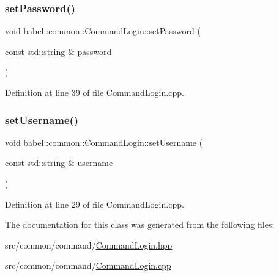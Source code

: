 \subsubsection{\texorpdfstring{set\+Password()}{setPassword()}}
{\footnotesize\ttfamily void babel\+::common\+::\+Command\+Login\+::set\+Password (\begin{DoxyParamCaption}\item[{const std\+::string \&}]{password }\end{DoxyParamCaption})}



Definition at line 39 of file Command\+Login.\+cpp.

\mbox{\label{classbabel_1_1common_1_1_command_login_a88f5f41f0152259bd1351f5c1121b853}} 
\subsubsection{\texorpdfstring{set\+Username()}{setUsername()}}
{\footnotesize\ttfamily void babel\+::common\+::\+Command\+Login\+::set\+Username (\begin{DoxyParamCaption}\item[{const std\+::string \&}]{username }\end{DoxyParamCaption})}



Definition at line 29 of file Command\+Login.\+cpp.



The documentation for this class was generated from the following files\+:\begin{DoxyCompactItemize}
\item 
src/common/command/\mbox{\hyperlink{_command_login_8hpp}{Command\+Login.\+hpp}}\item 
src/common/command/\mbox{\hyperlink{_command_login_8cpp}{Command\+Login.\+cpp}}\end{DoxyCompactItemize}
